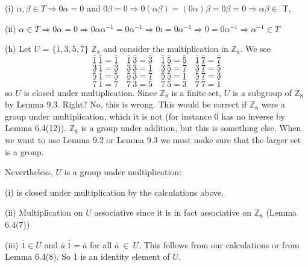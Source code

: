 \documentclass[11pt]{amsbook}
\begin{document}

\quad (i) \(\alpha, \beta \in T \Rightarrow 0\alpha = 0\)  and \(0\beta = 0 \Rightarrow 0(\alpha\beta) = (0\alpha)\beta = 0\beta = 0 \Rightarrow \alpha\beta \in\) T,


\quad(ii) \(\alpha \in T \Rightarrow 0\alpha = 0 \Rightarrow 0\alpha\alpha^{-1} = 0\alpha^{-1} \Rightarrow 0ı = 0\alpha^{-1} \Rightarrow 0 = 0\alpha^{-1} \Rightarrow \alpha^{-1} \in T\)



(h) Let \(\mathit{U}\) = \(\lbrace \bar{1}, \bar{3}, \bar{5}, \bar{7} \rbrace \) \subseteq \(\mathbb{Z}_8\) and consider the multiplication in \(\mathbb{Z}_8\). We see
    \[ \bar{1} \ \bar{1} = \bar{1} \quad \bar{1} \ \bar{3} = \bar{3} \quad \bar{1} \ \bar{5} = \bar{5} \quad \bar{1} \ \bar{7} = \bar{7} \]
    \[ \bar{3} \ \bar{1} = \bar{3} \quad \bar{3} \ \bar{3} = \bar{1} \quad \bar{3} \ \bar{5} = \bar{7} \quad \bar{3} \ \bar{7} = \bar{5} \]
    \[ \bar{5} \ \bar{1} = \bar{5} \quad \bar{5} \ \bar{3} = \bar{7} \quad \bar{5} \ \bar{5} = \bar{1} \quad \bar{5} \ \bar{7} = \bar{3} \]
    \[ \bar{7} \ \bar{1} = \bar{7} \quad \bar{7} \ \bar{3} = \bar{5} \quad \bar{7} \ \bar{5} = \bar{3} \quad \bar{7} \ \bar{7} = \bar{1} \]
   so \(\mathit{U}\) is closed under multiplication. Since \(\mathbb{Z}_8\) is a finite set, \(\mathit{U}\) is a subgroup of \(\mathbb{Z}_8\) by Lemma 9.3. Right? No, this is wrong. This would be correct if \(\mathbb{Z}_8\) were a group under multiplication, which it is not (for instance \(\bar{0}\) has no inverse by Lemma 6.4(12)). \(\mathbb{Z}_8\) is a group under addition, but this is something else. When we want to use Lemma 9.2 or Lemma 9.3 we must make sure that the larger set is a group. 

Nevertheless, \(\mathit{U}\) is a group under multiplication:

\quad (i)  is closed under multiplication by the calculations above.

\quad(ii) Multiplication on \(\mathit{U}\) associative since it is in fact associative on \(\mathbb{Z}_8\) (Lemma 6.4(7))

\quad(iii) \(\bar{1} \in  \mathit{U}\) and \( \bar{a} \ \bar{1} = \bar{a} \) for all \( \bar{a} \ \in \ \mathit{U}\). This follows from our calculations or from Lemma 6.4(8). So \(\bar{1}\) is an identity element of \(\mathit{U}\).
\end{document}

